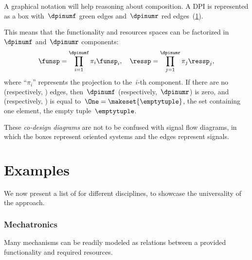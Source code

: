 A graphical notation will help reasoning about composition.
A DPI is represented as a box with~$\dpinumf$ green edges and~$\dpinumr$ red edges~(\cref{fig:dp_graphical}).

\begin{figure}[h!]
    \centering
    \caption{\label{fig:dp_graphical}}
\end{figure}


This means that the functionality and resources spaces can be factorized in~$\dpinumf$ and~$\dpinumr$ components:
\begin{equation}
    \funsp=\prod_{i=1}^{\dpinumf}\pi_{i}\funsp_{i},\quad \ressp=\prod_{j=1}^{\dpinumr}\pi_{j}\ressp_{j},
\end{equation}
where ``$\pi_{i}$'' represents the projection to the~$i$-th component.
If there are no  (respectively, ) edges, then~$\dpinumf$ (respectively,~$\dpinumr$) is zero, and \funsp (respectively, \ressp) is equal to~$\One=\makeset{\emptytuple }$, the set containing one element, the empty tuple~$\emptytuple$.

These \emph{co-design diagrams} are not to be confused with signal flow diagrams, in which the boxes represent oriented systems and the edges represent signals.



\section{Examples}
We now present a list of  for different disciplines, to showcase the universality of the approach.

\subsubsection{Mechatronics}
Many mechanisms can be readily modeled as relations between a provided functionality and required resources.


